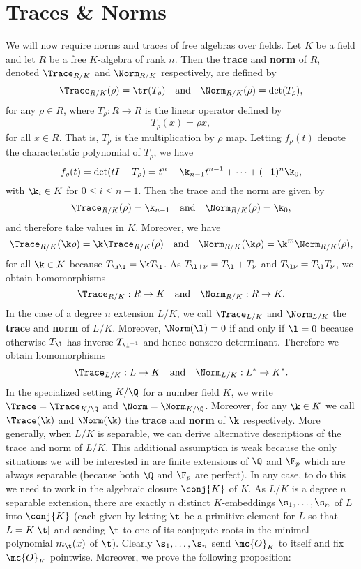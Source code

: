   \section{Traces \& Norms}
    We will now require norms and traces of free algebras over fields. Let $K$ be a field and let $R$ be a free $K$-algebra of rank $n$. Then the \textbf{trace} and \textbf{norm} of $R$, denoted $\Trace_{R/K}$ and $\Norm_{R/K}$ respectively, are defined by
    \[
      \Trace_{R/K}(\rho) = \tr(T_{\rho}) \quad \text{and} \quad \Norm_{R/K}(\rho) = \det(T_{\rho}),
    \]
    for any $\rho \in R$, where $T_{\rho}:R \to R$ is the linear operator defined by
    \[
      T_{\rho}(x) = \rho x,
    \]
    for all $x \in R$. That is, $T_{\rho}$ is the multiplication by $\rho$ map. Letting $f_{\rho}(t)$ denote the characteristic polynomial of $T_{\rho}$, we have
    \[
      f_{\rho}(t) = \det(tI-T_{\rho}) = t^{n}-\k_{n-1}t^{n-1}+\cdots+(-1)^{n}\k_{0},
    \]
    with $\k_{i} \in K$ for $0 \le i \le n-1$. Then the trace and the norm are given by
    \begin{equation}\label{equ:trace_and_norm_characteristic_polynomial}
      \Trace_{R/K}(\rho) = \k_{n-1} \quad \text{and} \quad \Norm_{R/K}(\rho) = \k_{0},
    \end{equation}
    and therefore take values in $K$. Moreover, we have
    \[
      \Trace_{R/K}(\k\rho) = \k\Trace_{R/K}(\rho) \quad \text{and} \quad \Norm_{R/K}(\k\rho) = \k^{m}\Norm_{R/K}(\rho),
    \]
    for all $\k \in K$ because $T_{\k\l} = \k T_{\l}$. As $T_{\l+\nu} = T_{\l}+T_{\nu}$ and $T_{\l \nu} = T_{\l}T_{\nu}$, we obtain homomorphisms
    \[
      \Trace_{R/K}:R \to K \quad \text{and} \quad \Norm_{R/K}:R \to K.
    \]
    In the case of a degree $n$ extension $L/K$, we call $\Trace_{L/K}$ and $\Norm_{L/K}$ the \textbf{trace} and \textbf{norm} of $L/K$. Moreover, $\Norm(\l) = 0$ if and only if $\l = 0$ because otherwise $T_{\l}$ has inverse $T_{\l^{-1}}$ and hence nonzero determinant. Therefore we obtain homomorphisms
    \[
      \Trace_{L/K}:L \to K \quad \text{and} \quad \Norm_{L/K}:L^{\ast} \to K^{\ast}.
    \]
    In the specialized setting $K/\Q$ for a number field $K$, we write $\Trace = \Trace_{K/\Q}$ and $\Norm = \Norm_{K/\Q}$. Moreover, for any $\k \in K$ we call $\Trace(\k)$ and $\Norm(\k)$ the \textbf{trace} and \textbf{norm} of $\k$ respectively. More generally, when $L/K$ is separable, we can derive alternative descriptions of the trace and norm of $L/K$. This additional assumption is weak because the only situations we will be interested in are finite extensions of $\Q$ and $\F_{p}$ which are always separable (because both $\Q$ and $\F_{p}$ are perfect). In any case, to do this we need to work in the algebraic closure $\conj{K}$ of $K$. As $L/K$ is a degree $n$ separable extension, there are exactly $n$ distinct $K$-embeddings $\s_{1},\ldots,\s_{n}$ of $L$ into $\conj{K}$ (each given by letting $\t$ be a primitive element for $L$ so that $L = K[\t]$ and sending $\t$ to one of its conjugate roots in the minimal polynomial $m_{\t}(x)$ of $\t$). Clearly $\s_{1},\ldots,\s_{n}$ send $\mc{O}_{K}$ to itself and fix $\mc{O}_{K}$ pointwise. Moreover, we prove the following proposition:


